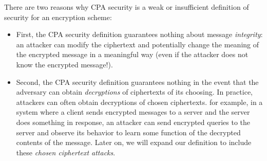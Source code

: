 There are two reasons why CPA security is a weak or insufficient 
definition of security for an encryption scheme:
\begin{itemize}
  \item First, the CPA security definition
    guarantees nothing about message
    \emph{integrity}: an attacker can modify the
    ciphertext and potentially change the meaning
    of the encrypted message in a meaningful way
    (even if the attacker does not know the encrypted message!).
  \item Second, the CPA security definition guarantees
    nothing in the event that the adversary can obtain
    \emph{decryptions} of ciphertexts of its choosing.
    In practice, attackers can often obtain decryptions
    of chosen ciphertexts.
    for example, in a system where a client sends encrypted messages to a server and the server does something in response, an attacker can send encrypted queries to the server and observe its behavior to learn some function of the decrypted contents of the message. Later on, we will expand our definition to include these \textit{chosen ciphertext attacks}.
\end{itemize}

